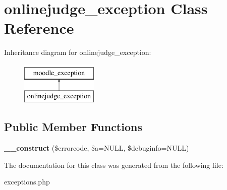 \hypertarget{classonlinejudge__exception}{\section{onlinejudge\-\_\-exception Class Reference}
\label{classonlinejudge__exception}
}
Inheritance diagram for onlinejudge\-\_\-exception\-:\begin{figure}[H]
\begin{center}
\leavevmode
\includegraphics[height=2.000000cm]{classonlinejudge__exception}
\end{center}
\end{figure}
\subsection*{Public Member Functions}
\begin{DoxyCompactItemize}
\item 
\hypertarget{classonlinejudge__exception_ae174ebe037099e6d9a2fa16633809e5e}{{\bfseries \-\_\-\-\_\-construct} (\$errorcode, \$a=N\-U\-L\-L, \$debuginfo=N\-U\-L\-L)}\label{classonlinejudge__exception_ae174ebe037099e6d9a2fa16633809e5e}

\end{DoxyCompactItemize}


The documentation for this class was generated from the following file\-:\begin{DoxyCompactItemize}
\item 
exceptions.\-php\end{DoxyCompactItemize}
